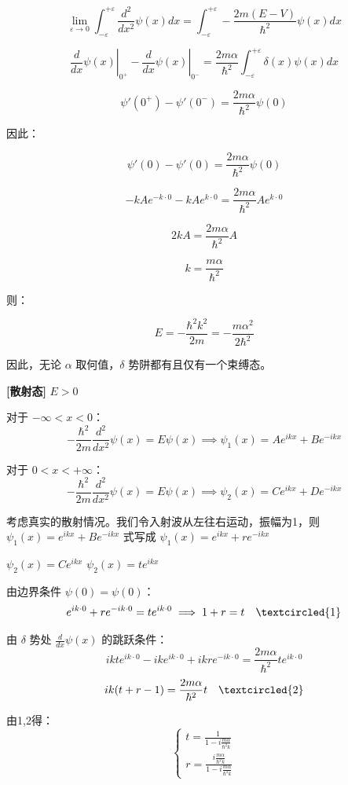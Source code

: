 \documentclass[lang=cn,10pt]{elegantbook}
\begin{document}
\[
\lim_{\varepsilon \to 0} \int_{-\varepsilon}^{+\varepsilon} \frac{d^2}{dx^2} \psi(x) dx = \int_{-\varepsilon}^{+\varepsilon} -\frac{2m(E-V)}{\hbar^2} \psi(x) dx
\]

\[
\left. \frac{d}{dx} \psi(x) \right|_{0^+} - \left. \frac{d}{dx} \psi(x) \right|_{0^-} = \frac{2m\alpha}{\hbar^2} \int_{-\varepsilon}^{+\varepsilon} \delta(x) \psi(x) dx
\]

\[
\psi'(0^+) - \psi'(0^-) = \frac{2m\alpha}{\hbar^2} \psi(0)
\]

因此：

\[
\psi'(0) - \psi'(0) = \frac{2m\alpha}{\hbar^2} \psi(0)
\]

\[
-kAe^{-k\cdot0} - kAe^{k\cdot0} = \frac{2m\alpha}{\hbar^2} A e^{k\cdot0}
\]

\[
2kA = \frac{2m\alpha}{\hbar^2} A
\]

\[
k = \frac{m\alpha}{\hbar^2}
\]

则：

\[
E = -\frac{\hbar^2 k^2}{2m} = -\frac{m\alpha^2}{2\hbar^2}
\]

因此，无论 $\alpha$ 取何值，$\delta$ 势阱都有且仅有一个束缚态。

\textbf{[散射态]} $E > 0$

对于 $-\infty < x < 0$：
\[
-\frac{\hbar^2}{2m} \frac{d^2}{dx^2} \psi(x) = E \psi(x) \implies \psi_1(x) = A e^{ikx} + B e^{-ikx}
\]

对于 $0 < x < +\infty$：
\[
-\frac{\hbar^2}{2m} \frac{d^2}{dx^2} \psi(x) = E \psi(x) \implies \psi_2(x) = C e^{ikx} + D e^{-ikx}
\]

考虑真实的散射情况。我们令入射波从左往右运动，振幅为1，则 $\psi_1(x) = e^{ikx} + B e^{-ikx}$ 式写成 $\psi_1(x) = e^{ikx} + r e^{-ikx}$

$\psi_2(x) = C e^{ikx}$ $\psi_2(x) = t e^{ikx}$

由边界条件 $\psi(0) = \psi(0)$：
\[
e^{ik\cdot0} + r e^{-ik\cdot0} = t e^{ik\cdot0} \implies 1 + r = t \quad \textcircled{1}
\]

由 $\delta$ 势处 $\frac{d}{dx} \psi(x)$ 的跳跃条件：
\[
ikte^{ik\cdot0} - ik e^{ik\cdot0} + ikr e^{-ik\cdot0} = \frac{2m\alpha}{\hbar^2} t e^{ik\cdot0}
\]
\[
ik(t + r - 1) = \frac{2m\alpha}{\hbar^2} t \quad \textcircled{2}
\]

由1,2得：
\[
\left\{
\begin{array}{l}
	t = \frac{1}{1 - i\frac{m\alpha}{\hbar^2 k}} \\
	r = \frac{i\frac{m\alpha}{\hbar^2 k}}{1 - i\frac{m\alpha}{\hbar^2 k}}
\end{array}
\right.
\]
\end{document}
